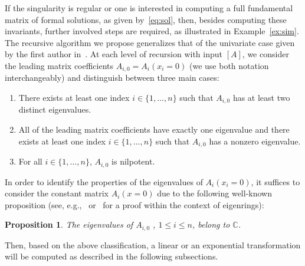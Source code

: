 \documentclass[final,1p,times,number,amsthm]{elsart}
\newtheorem{proposition}[lemma]{Proposition}
\begin{document}
If the singularity is regular or one is interested in computing a full
fundamental matrix of formal solutions, as given by~\eqref{eq:sol}, then, besides
computing these invariants, further involved steps are required, as illustrated
in Example~\ref{ex:sim}. The recursive algorithm we propose generalizes that of
the univariate case given by the first author in~\cite{key24}. At each level of
recursion with input $[A]$, we consider the leading matrix coefficients
$A_{i,0}=A_i(x_i=0)$ (we use both notation interchangeably) and distinguish
between three main cases:

\begin{enumerate}
\item There exists at least one index $i \in \{ 1, \dots, n \}$ such that
  $A_{i,0}$ has at least two distinct eigenvalues.
\item All of the leading matrix coefficients have exactly one eigenvalue and
  there exists at least one index $i \in \{ 1, \dots, n \}$ such that
  $A_{i,0}$ has a nonzero eigenvalue.
\item For all $i \in \{ 1, \dots, n \}$, $A_{i,0}$ is nilpotent.
\end{enumerate}
\vspace{0.3cm}

In order to identify the properties of the eigenvalues of $A_{i}(x_i=0)$, it
suffices to consider the constant matrix $A_i(x=0)$ due to the following
well-known proposition (see, e.g.,~\cite[Proposition 1, pp 8]{key4}
or~\cite[Proposition 2.2]{key9} for a proof within the context of eigenrings):
\begin{proposition}
\label{constev}
The eigenvalues of $A_{i,0}$ , $1 \leq i \leq n$, belong to $\mathbb{C}$.
\end{proposition}
Then, based on the above classification, a linear or an exponential
transformation will be computed as described in the following subsections.
\end{document}
